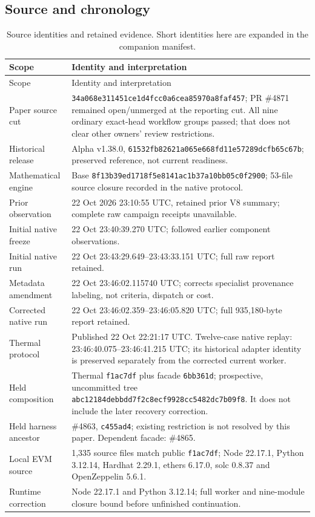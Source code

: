 \documentclass[11pt,a4paper]{article}
\begin{document}
\subsection{Source and chronology}
\begin{longtable}{@{}P{39mm}P{115mm}@{}}
\caption{Source identities and retained evidence. Short identities here are expanded in the companion manifest.}\label{tab:sources}\\
\toprule
Scope & Identity and interpretation\\
\midrule
\endfirsthead
\toprule
Scope & Identity and interpretation\\
\midrule
\endhead
Paper source cut & \texttt{34a068e311451ce1d4fcc0a6cea85970a8faf457}; PR \#4871 remained open/unmerged at the reporting cut. All nine ordinary exact-head workflow groups passed; that does not clear other owners' review restrictions.\\
Historical release & Alpha v1.38.0, \texttt{61532fb82621a065e668fd11e57289dcfb65c67b}; preserved reference, not current readiness.\\
Mathematical engine & Base \texttt{8f13b39ed1718f5e8141ac1b37a10bb05c0f2900}; 53-file source closure recorded in the native protocol.\\
Prior observation & 22 Oct 2026 23:10:55 UTC, retained prior V8 summary; complete raw campaign receipts unavailable.\\
Initial native freeze & 22 Oct 23:40:39.270 UTC; followed earlier component observations.\\
Initial native run & 22 Oct 23:43:29.649--23:43:33.151 UTC; full raw report retained.\\
Metadata amendment & 22 Oct 23:46:02.115740 UTC; corrects specialist provenance labeling, not criteria, dispatch or cost.\\
Corrected native run & 22 Oct 23:46:02.359--23:46:05.820 UTC; full 935,180-byte report retained.\\
Thermal protocol & Published 22 Oct 22:21:17 UTC. Twelve-case native replay: 23:46:40.075--23:46:41.215 UTC; its historical adapter identity is preserved separately from the corrected current worker.\\
Held composition & Thermal \texttt{f1ac7df} plus facade \texttt{6bb361d}; prospective, uncommitted tree \texttt{abc12184debbdd7f2c8ecf9928cc5482dc7b09f8}. It does not include the later recovery correction.\\
Held harness ancestor & \#4863, \texttt{c455ad4}; existing restriction is not resolved by this paper. Dependent facade: \#4865.\\
Local EVM source & 1,335 source files match public \texttt{f1ac7df}; Node 22.17.1, Python 3.12.14, Hardhat 2.29.1, ethers 6.17.0, solc 0.8.37 and OpenZeppelin 5.6.1.\\
Runtime correction & Node 22.17.1 and Python 3.12.14; full worker and nine-module closure bound before unfinished continuation.\\
\bottomrule
\end{longtable}
\end{document}
